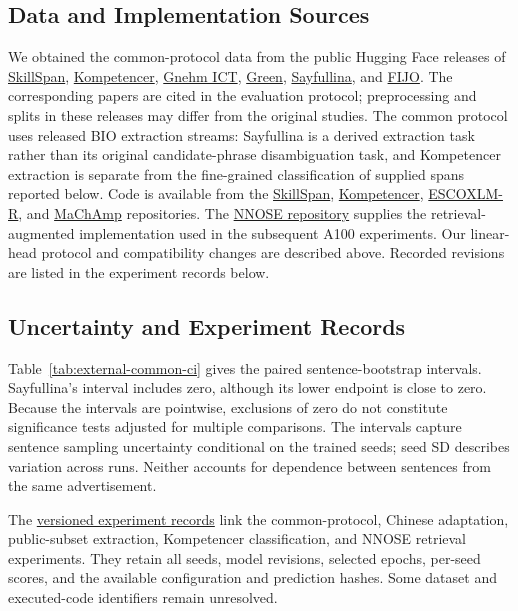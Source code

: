 \subsection{Data and Implementation Sources}
We obtained the common-protocol data from the public Hugging Face releases of
\href{https://huggingface.co/datasets/jjzha/skillspan}{SkillSpan},
\href{https://huggingface.co/datasets/jjzha/kompetencer}{Kompetencer},
\href{https://huggingface.co/datasets/jjzha/gnehm}{Gnehm ICT},
\href{https://huggingface.co/datasets/jjzha/green}{Green},
\href{https://huggingface.co/datasets/jjzha/sayfullina}{Sayfullina}, and
\href{https://huggingface.co/datasets/jjzha/fijo}{FIJO}.
The corresponding papers are cited in the evaluation protocol; preprocessing and splits in these releases may differ from the original studies. The common protocol uses released BIO extraction streams: Sayfullina is a derived extraction task rather than its original candidate-phrase disambiguation task, and Kompetencer extraction is separate from the fine-grained classification of supplied spans reported below. Code is available from the
\href{https://github.com/kris927b/SkillSpan}{SkillSpan},
\href{https://github.com/jjzha/kompetencer}{Kompetencer},
\href{https://github.com/mainlp/escoxlmr}{ESCOXLM-R}, and
\href{https://github.com/machamp-nlp/machamp}{MaChAmp} repositories.
The \href{https://github.com/jjzha/nnose}{NNOSE repository} supplies the retrieval-augmented implementation used in the subsequent A100 experiments.
Our linear-head protocol and compatibility changes are described above. Recorded revisions are listed in the experiment records below.

\subsection{Uncertainty and Experiment Records}
Table~\ref{tab:external-common-ci} gives the paired sentence-bootstrap intervals. Sayfullina's interval includes zero, although its lower endpoint is close to zero. Because the intervals are pointwise, exclusions of zero do not constitute significance tests adjusted for multiple comparisons. The intervals capture sentence sampling uncertainty conditional on the trained seeds; seed SD describes variation across runs. Neither accounts for dependence between sentences from the same advertisement.

The \href{https://github.com/AlfredJamesLi/chinese-skillspan-benchmark/blob/36f009fab01b8433355cb7ef5af8fad02c6cc519/reproduction/process_archive_20260924/README.md}{versioned experiment records} link the common-protocol, Chinese adaptation, public-subset extraction, Kompetencer classification, and NNOSE retrieval experiments. They retain all seeds, model revisions, selected epochs, per-seed scores, and the available configuration and prediction hashes. Some dataset and executed-code identifiers remain unresolved.

